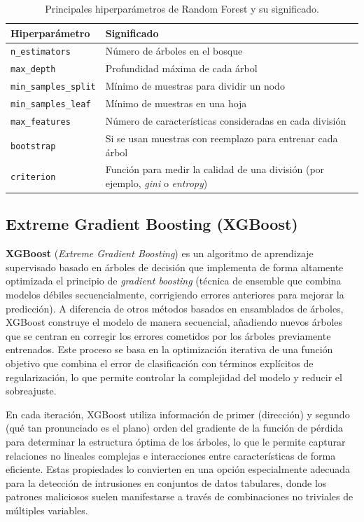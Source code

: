 \begin{table}[H]
    \centering
    \caption{Principales hiperparámetros de Random Forest y su significado.}
    \label{tab:rf_hyperparams}
    \begin{tabular}{ll}
        \toprule
        \textbf{Hiperparámetro} & \textbf{Significado} \\
        \midrule
        \texttt{n\_estimators} & Número de árboles en el bosque \\
        \texttt{max\_depth} & Profundidad máxima de cada árbol \\
        \texttt{min\_samples\_split} & Mínimo de muestras para dividir un nodo \\
        \texttt{min\_samples\_leaf} & Mínimo de muestras en una hoja \\
        \texttt{max\_features} & Número de características consideradas en cada división \\
        \texttt{bootstrap} & Si se usan muestras con reemplazo para entrenar cada árbol \\
        \texttt{criterion} & Función para medir la calidad de una división (por ejemplo, \textit{gini} o \textit{entropy}) \\
        \bottomrule
    \end{tabular}
\end{table}


\subsection{Extreme Gradient Boosting (XGBoost)}

\textbf{XGBoost} (\textit{Extreme Gradient Boosting}) es un algoritmo de aprendizaje supervisado basado en árboles de decisión que implementa de forma altamente optimizada el principio de \textit{gradient boosting} (técnica de ensemble que combina modelos débiles secuencialmente, corrigiendo errores anteriores para mejorar la predicción). A diferencia de otros métodos basados en ensamblados de árboles, XGBoost construye el modelo de manera secuencial, añadiendo nuevos árboles que se centran en corregir los errores cometidos por los árboles previamente entrenados. Este proceso se basa en la optimización iterativa de una función objetivo que combina el error de clasificación con términos explícitos de regularización, lo que permite controlar la complejidad del modelo y reducir el sobreajuste.

En cada iteración, XGBoost utiliza información de primer (dirección) y segundo (qué tan pronunciado es el plano) orden del gradiente de la función de pérdida para determinar la estructura óptima de los árboles, lo que le permite capturar relaciones no lineales complejas e interacciones entre características de forma eficiente. Estas propiedades lo convierten en una opción especialmente adecuada para la detección de intrusiones en conjuntos de datos tabulares, donde los patrones maliciosos suelen manifestarse a través de combinaciones no triviales de múltiples variables.

